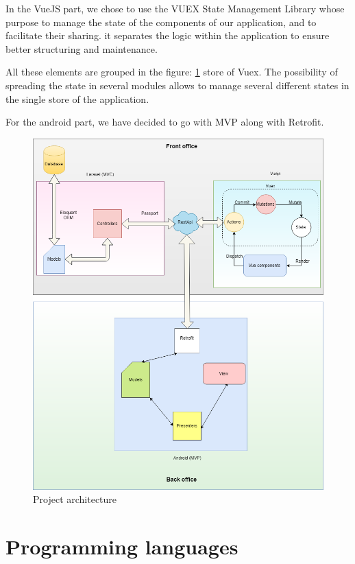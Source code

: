 \documentclass[12pt,a4paper]{report}
\begin{document}
	In the
	VueJS part, we chose to use the VUEX State Management Library whose purpose
	to manage the state of the components of our application, and to facilitate their sharing.
	it separates the logic within the application to ensure better structuring and maintenance.
	\par

All these elements are grouped in the figure: \ref{label-archi} store of Vuex. The possibility of spreading
the state in several modules allows to manage several different states in the single store of
the application.\par

For the android part, we have decided to go with MVP along with Retrofit.
	\begin{figure}[H]
		\centering
		\includegraphics[width=6.7in,keepaspectratio]{archi.png}
		\caption{Project architecture}
		\label{label-archi}
	\end{figure}
	\section{Programming languages}
\end{document}
